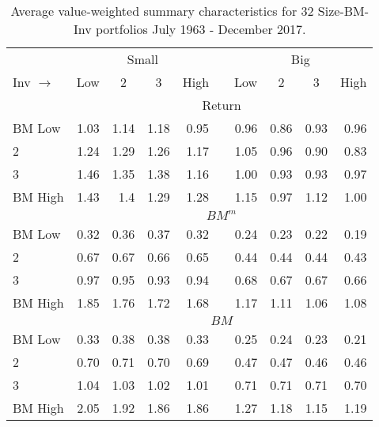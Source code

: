 
\begin{table}[!ht]

\centering
\caption{
\scriptsize{
Average value-weighted summary characteristics for 32 Size-BM-Inv portfolios
July 1963 - December 2017.
}
}
\begin{tabular}{lrrrrcrrrr}
  \toprule
    & \multicolumn{4}{c}{Small} & & \multicolumn{4}{c}{Big} \\
    \cmidrule(r){2-5} \cmidrule(r){7-10}
  Inv   $\rightarrow$     & \multicolumn{1}{c}{Low}  & \multicolumn{1}{c}{2} & \multicolumn{1}{c}{3} & \multicolumn{1}{c}{High} &  & \multicolumn{1}{c}{Low} & \multicolumn{1}{c}{2} & \multicolumn{1}{c}{3} & \multicolumn{1}{c}{High} \\
                          & \multicolumn{9}{c}{Return} \\
  BM Low                  &  1.03 &  1.14 &  1.18 &  0.95 & &  0.96 &  0.86 &  0.93 &  0.96 \\
  2                       &  1.24 &  1.29 &  1.26 &  1.17 & &  1.05 &  0.96 &  0.90 &  0.83 \\
  3                       &  1.46 &  1.35 &  1.38 &  1.16 & &  1.00 &  0.93 &  0.93 &  0.97 \\
  BM High                 &  1.43 &  1.4  &  1.29 &  1.28 & &  1.15 &  0.97 &  1.12 &  1.00 \\
[1em]
                          & \multicolumn{9}{c}{$BM^m$} \\
  BM Low                  &  0.32 &  0.36 &  0.37 &  0.32 & &  0.24 &  0.23 &  0.22 &  0.19 \\
  2                       &  0.67 &  0.67 &  0.66 &  0.65 & &  0.44 &  0.44 &  0.44 &  0.43 \\
  3                       &  0.97 &  0.95 &  0.93 &  0.94 & &  0.68 &  0.67 &  0.67 &  0.66 \\
  BM High                 &  1.85 &  1.76 &  1.72 &  1.68 & &  1.17 &  1.11 &  1.06 &  1.08 \\
[1em]
                          & \multicolumn{9}{c}{$BM$} \\
  BM Low                  &  0.33 &  0.38 &  0.38 &  0.33 & &  0.25 &  0.24 &  0.23 &  0.21 \\
  2                       &  0.70 &  0.71 &  0.70 &  0.69 & &  0.47 &  0.47 &  0.46 &  0.46 \\
  3                       &  1.04 &  1.03 &  1.02 &  1.01 & &  0.71 &  0.71 &  0.71 &  0.70 \\
  BM High                 &  2.05 &  1.92 &  1.86 &  1.86 & &  1.27 &  1.18 &  1.15 &  1.19 \\

\end{tabular}
\end{table}
